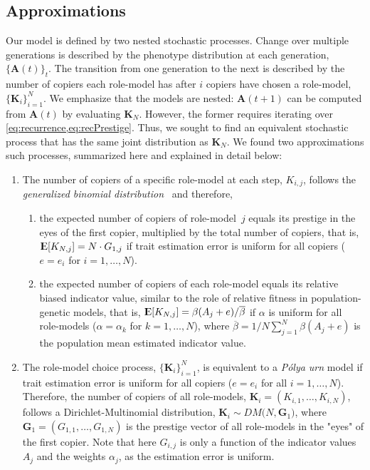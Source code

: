 \documentclass[12pt]{extarticle}
\DeclareMathOperator*{\E}{{\rm I\kern-.3em E}}
\let\vec\mathbf
\begin{document}
\subsection*{Approximations}
Our model is defined by two nested stochastic processes. Change over multiple generations is described by the phenotype distribution at each generation, $\{\vec{A}(t)\}_t$. The transition from one generation to the next is described by the number of copiers each role-model has after $i$ copiers have chosen a role-model, $\{\vec{K}_i\}_{i=1}^N$.
We emphasize that the models are nested: $\vec{A}(t+1)$ can be computed from $\vec{A}(t)$ by evaluating $\vec{K}_{N}$. However, the former requires iterating over \cref{eq:recurrence,eq:recPrestige}. Thus, we sought to find an equivalent stochastic process that has the same joint distribution as $\vec{K}_{N}$. 
We found two approximations such processes, summarized here and explained in detail below:
\begin{enumerate}
\item 
The number of copiers of a specific role-model at each step, $K_{i,j}$, follows the {\em generalized binomial distribution}~\citep{GBD} and therefore,
\begin{enumerate}\item the expected number of copiers of role-model~$j$ equals its prestige in the eyes of the first copier, multiplied by the total number of copiers, that is,
$\E[K_{N,j}] = N \cdot G_{1,j}$ if trait estimation error is uniform for all copiers ($e=e_i$ for $i=1, \ldots, N$).
\item the expected number of copiers of each role-model equals its relative biased indicator value, similar to the role of relative fitness in population-genetic models, that is, $\E[K_{N,j}] = \beta(A_j+e) / \overline{\beta}$ if $\alpha$ is uniform for all role-models ($\alpha=\alpha_k$ for $k=1,\ldots,N$), where $\overline{\beta}=1/N \sum_{j=1}^{N}{\beta(A_j+e)}$ is the population mean estimated indicator value. 
\end{enumerate}
\item The role-model choice process, $\{\vec{K}_{i}\}_{i=1}^{N}$, is equivalent to a {\em P\'{o}lya urn} model if trait estimation error is uniform for all copiers ($e=e_i$ for all $i=1, \ldots, N$). 
Therefore, the number of copiers of all role-models, $\vec{K}_i = (K_{i,1}, \ldots, K_{i,N})$, follows a Dirichlet-Multinomial distribution,
$\vec{K}_i \sim \mathit{DM}\big(N, \vec{G}_1\big)$, where $\vec{G}_1 = (G_{1,1}, \ldots, G_{1,N})$ is the prestige vector of all role-models in the "eyes" of the first copier.
Note that here $G_{i,j}$ is only a function of the indicator values $A_j$ and the weights $\alpha_j$, as the estimation error is uniform. %
\end{enumerate}
\end{document}
